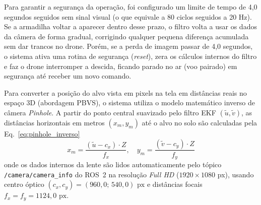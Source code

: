 Para garantir a segurança da operação, foi configurado um limite de tempo de 4,0 segundos seguidos sem sinal visual (o que equivale a 80 ciclos seguidos a 20 Hz). Se a armadilha voltar a aparecer dentro desse prazo, o filtro volta a usar os dados da câmera de forma gradual, corrigindo qualquer pequena diferença acumulada sem dar trancos no drone. Porém, se a perda de imagem passar de 4,0 segundos, o sistema ativa uma rotina de segurança (\textit{reset}), zera os cálculos internos do filtro e faz o drone interromper a descida, ficando parado no ar (voo pairado) em segurança até receber um novo comando.


Para converter a posição do alvo vista em pixels na tela em distâncias reais no espaço 3D (abordagem PBVS), o sistema utiliza o modelo matemático inverso de câmera \textit{Pinhole}. A partir do ponto central suavizado pelo filtro EKF $(\tilde{u}, \tilde{v})$, as distâncias horizontais em metros $(x_m, y_m)$ até o alvo no solo são calculadas pela Eq.~\ref{eq:pinhole_inverso}
\begin{equation}
	x_m = \frac{(\tilde{u} - c_x) \cdot Z}{f_x}, \quad y_m = \frac{(\tilde{v} - c_y) \cdot Z}{f_y}
	\label{eq:pinhole_inverso}
\end{equation}
onde os dados internos da lente são lidos automaticamente pelo tópico \texttt{/camera/\allowbreak camera\_info} do ROS~2 na resolução \textit{Full HD} ($1920 \times 1080$ px), usando centro óptico $(c_x, c_y) = (960{,}0;\, 540{,}0)\text{ px}$ e distâncias focais $f_x = f_y = 1124{,}0\text{ px}$.

